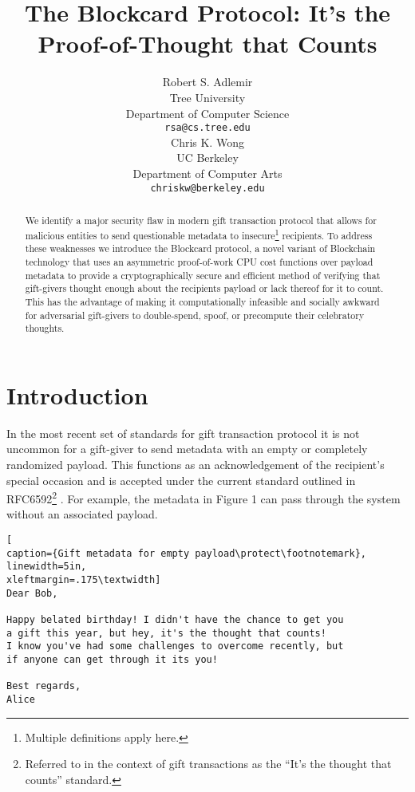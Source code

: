 \documentclass[
parskip=half
]{article}
\title{The Blockcard Protocol: It's the Proof-of-Thought that Counts}
\author{
  Robert S. Adlemir \\
  Tree University\\
  Department of Computer Science \\
  \texttt{rsa@cs.tree.edu} \\
 \And 
  Chris K. Wong \\
  UC Berkeley\\
  Department of Computer Arts \\
  \texttt{chriskw@berkeley.edu} \\
}
\begin{document}
\maketitle

\begin{abstract}
We identify a major security flaw in modern gift transaction protocol that allows for malicious entities to send questionable metadata to insecure\footnote{Multiple definitions apply here.} recipients. To address these weaknesses we introduce the Blockcard protocol, a novel variant of Blockchain technology that uses an asymmetric proof-of-work CPU cost functions over payload metadata to provide a cryptographically secure and efficient method of verifying that gift-givers thought enough about the recipients payload or lack thereof for it to count. This has the advantage of making it computationally infeasible and socially awkward for adversarial gift-givers to double-spend, spoof, or precompute their celebratory thoughts.

\end{abstract}

\section{Introduction}
 In the most recent set of standards for gift transaction protocol it is not uncommon for a gift-giver to send metadata with an empty or completely randomized payload. This functions as an acknowledgement of the recipient's special occasion and is accepted under the current standard outlined in RFC6592\footnote{Referred to in the context of gift transactions as the “It's the thought that counts” standard.} \cite{rfc6592}. For example, the metadata in Figure 1 can pass through the system without an associated payload.

\begin{lstlisting}[
caption={Gift metadata for empty payload\protect\footnotemark},
linewidth=5in,
xleftmargin=.175\textwidth]
Dear Bob,

Happy belated birthday! I didn't have the chance to get you
a gift this year, but hey, it's the thought that counts!
I know you've had some challenges to overcome recently, but 
if anyone can get through it its you!

Best regards,
Alice
\end{lstlisting}
\end{document}
